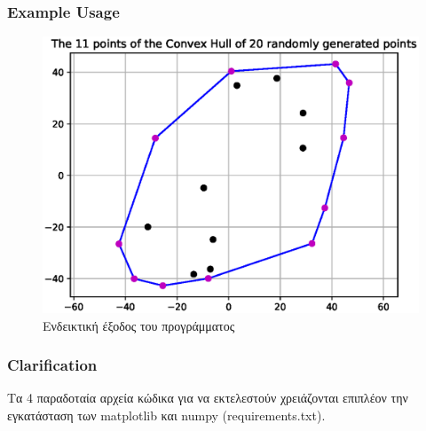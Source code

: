 \documentclass[12pt]{article}
\newenvironment{matlab}
	{\begin{figure}[H]\centering\captionsetup{justification=centering}}
	{\end{figure}}
\begin{document}
\subsubsection*{Example Usage}

\begin{matlab}
    \includegraphics[scale=1]{images/gift_wrapping_algorithm.eps}
    \caption{Ενδεικτική έξοδος του προγράμματος}
\end{matlab}

\pagebreak

\subsubsection*{Clarification}

Τα 4 παραδοταία αρχεία κώδικα για να εκτελεστούν χρειάζονται επιπλέον την εγκατάσταση των matplotlib και numpy (requirements.txt). \\
\end{document}
